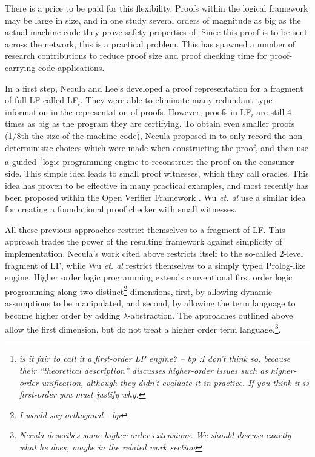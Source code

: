\documentclass{acmconf}
\newcommand{\ednote}[1]{\footnote{\it #1}}
\begin{document}
There is a price to be paid for this flexibility. Proofs within the
logical framework may be large in size, and in one study
several orders of magnitude as big as the actual machine code they
prove safety properties of. Since this proof is to be sent across the
network, this is a practical problem. This has spawned a number of
research contributions to reduce proof size and proof checking time
for proof-carrying code applications.

In a first step, Necula and Lee's \cite{Necula98lics} developed a
proof representation for a fragment of full LF called LF$_i$. They
were able to eliminate many redundant type information in the
representation of proofs. However, proofs in LF$_i$ are still 4-times
as big as the program they are certifying. To obtain even smaller
proofs (1/8th the size of the machine code), Necula proposed in
\cite{Necula+01:oracle} to only record the non-deterministic choices
which were made when constructing the proof, and then use a guided
\ednote{is it fair to call it a first-order LP engine? -- bp :I don't
  think so, because their ``theoretical description'' discusses
  higher-order issues such as higher-order unification, although they
  didn't evaluate it in practice. If you think it is first-order you
  must justify why.}logic programming engine to reconstruct the proof
on the consumer side. This simple idea leads to small proof witnesses,
which they call oracles. This idea has proven to be effective in many
practical examples, and most recently has been proposed within the
Open Verifier Framework \cite{Necula?}. Wu {\em{et. al}}
\cite{Appel:PPDP03} use a similar idea for creating a foundational
proof checker with small witnesses. 

All these previous approaches restrict themselves to a fragment of LF.
This approach trades the power of the resulting framework against
simplicity of implementation. Necula's work cited above restricts
itself to the so-called 2-level fragment of LF, while Wu {\em et. al}
restrict themselves to a simply typed Prolog-like engine. Higher order
logic programming extends conventional first order logic programming
along two distinct\ednote{I would say orthogonal - bp} dimensions,
first, by allowing dynamic assumptions to be manipulated, and second,
by allowing the term language to become higher order by adding
$\lambda$-abstraction. The approaches outlined above allow the first
dimension, but do not treat a higher order term
language.\ednote{Necula describes some higher-order extensions. We 
should discuss exactly what he does, maybe in the related work
section}.
\end{document}
